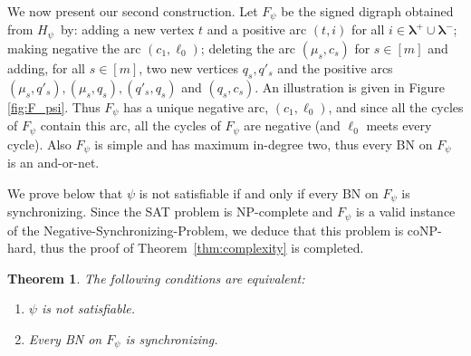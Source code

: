 \documentclass[11pt,letter]{article}
\newtheorem{theorem}{Theorem}
\newcommand{\LAMBDA}{\boldsymbol{\lambda}}
\begin{document}
We now present our second construction. Let $F_\psi$ be the signed digraph obtained from $H_\psi$~by: adding a new vertex $t$ and a positive arc $(t,i)$ for all $i\in\LAMBDA^+\cup\LAMBDA^-$; making negative the arc $(c_1,\ell_0)$; deleting the arc $(\mu_s,c_s)$ for $s\in [m]$ and adding, for all $s\in [m]$, two new vertices $q_s,q'_s$ and the positive arcs $(\mu_s,q'_s),(\mu_s,q_s),(q'_s,q_s)$ and $(q_s,c_s)$. An illustration is given in Figure \ref{fig:F_psi}. Thus $F_\psi$ has a unique negative arc, $(c_1,\ell_0)$, and since all the cycles of $F_\psi$ contain this arc, all the cycles of $F_\psi$ are negative (and $\ell_0$ meets every cycle). Also $F_\psi$ is simple and has maximum in-degree two, thus every BN on $F_\psi$ is an and-or-net. 

\medskip
We prove below that $\psi$ is not satisfiable if and only if every BN on $F_\psi$ is synchronizing. Since the SAT problem is NP-complete and $F_\psi$ is a valid instance of the {\sc Negative-Synchronizing-Problem}, we deduce that this problem is coNP-hard, thus the proof of Theorem~\ref{thm:complexity} is completed. 

\begin{theorem}\label{thm:every_synch}
The following conditions are equivalent:
\begin{enumerate}
\item $\psi$ is not satisfiable.
\item Every BN on $F_\psi$ is synchronizing.
\end{enumerate}
\end{theorem}
\end{document}
